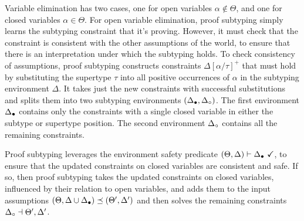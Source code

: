 \documentclass[acmsmall]{acmart}
\theoremstyle{definition}
\begin{document}










\noindent
Variable elimination has two cases, 
one for open variables $\alpha \not\in \Theta$,
and one for closed variables $\alpha \in \Theta$.
For open variable elimination, proof subtyping simply learns
the subtyping constraint that it's proving.
However, it must check that the constraint is consistent
with the other assumptions of the world,
to ensure that there is an interpretation under which the subtyping holds. 
To check consistency of assumptions,  
proof subtyping constructs constraints $\Delta[\alpha/\tau]^+$ that must hold by 
substituting the supertype $\tau$ into all positive occurrences
of $\alpha$ in the subtyping environment $\Delta$.
It takes just the new constraints with successful substitutions
and splits them into two subtyping environments $(\Delta_\bullet, \Delta_\circ)$. 
The first environment $\Delta_\bullet$ contains only the constraints with a single
closed variable in either the subtype or supertype position. The second
environment $\Delta_\circ$ contains all the remaining constraints.

Proof subtyping leverages the environment safety predicate 
$(\Theta, \Delta) \vdash \Delta_\bullet \ \checkmark$, 
to ensure that the updated constraints on closed variables are consistent and safe.
If so, then proof subtyping takes the updated constraints on closed variables, influenced by their relation
to open variables, and adds them to the input assumptions 
$(\Theta, \Delta \cup \Delta_\bullet) \preceq (\Theta', \Delta')$ 
and then solves the remaining constraints $\Delta_\circ \dashv \Theta', \Delta'$. 
\end{document}

